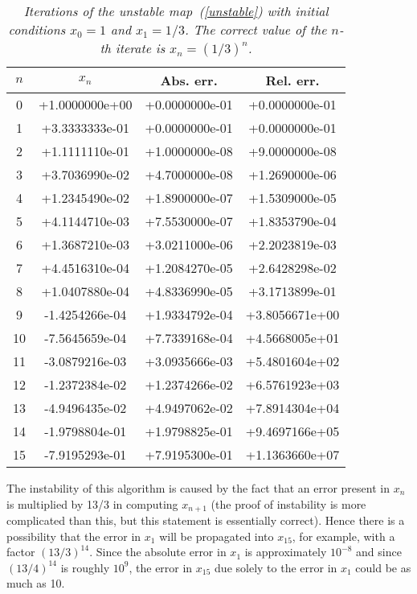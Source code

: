 \begin{table}
 \begin{center}
  \begin{tabular}{|c|c|c|c|} \hline
   $n$ & $x_n$ & Abs. err. & Rel. err. \\ \hline \hline
    0 & +1.0000000e+00 & +0.0000000e-01 & +0.0000000e-01 \\ \hline 
    1 & +3.3333333e-01 & +0.0000000e-01 & +0.0000000e-01 \\ \hline 
    2 & +1.1111110e-01 & +1.0000000e-08 & +9.0000000e-08 \\ \hline 
    3 & +3.7036990e-02 & +4.7000000e-08 & +1.2690000e-06 \\ \hline 
    4 & +1.2345490e-02 & +1.8900000e-07 & +1.5309000e-05 \\ \hline 
    5 & +4.1144710e-03 & +7.5530000e-07 & +1.8353790e-04 \\ \hline 
    6 & +1.3687210e-03 & +3.0211000e-06 & +2.2023819e-03 \\ \hline 
    7 & +4.4516310e-04 & +1.2084270e-05 & +2.6428298e-02 \\ \hline 
    8 & +1.0407880e-04 & +4.8336990e-05 & +3.1713899e-01 \\ \hline 
    9 & -1.4254266e-04 & +1.9334792e-04 & +3.8056671e+00 \\ \hline 
   10 & -7.5645659e-04 & +7.7339168e-04 & +4.5668005e+01 \\ \hline 
   11 & -3.0879216e-03 & +3.0935666e-03 & +5.4801604e+02 \\ \hline 
   12 & -1.2372384e-02 & +1.2374266e-02 & +6.5761923e+03 \\ \hline 
   13 & -4.9496435e-02 & +4.9497062e-02 & +7.8914304e+04 \\ \hline 
   14 & -1.9798804e-01 & +1.9798825e-01 & +9.4697166e+05 \\ \hline 
   15 & -7.9195293e-01 & +7.9195300e-01 & +1.1363660e+07 \\ \hline 
  \end{tabular}
 \end{center}
 \caption{\label{unst1} \it Iterations of the unstable
   map~(\ref{unstable}) with initial conditions $x_0=1$ and
   $x_1=1/3$.   The correct value of the $n$-th iterate is $x_n=(1/3)^n$.}
\end{table}

The instability of this algorithm is caused by the fact that an error
present in $x_n$ is multiplied by 13/3 in computing $x_{n+1}$ (the
proof of instability is more complicated than this, but this statement
is essentially correct).  Hence there is a possibility that the error
in $x_1$ will be propagated into $x_{15}$, for example, with a factor
$(13/3)^{14}$.    Since the absolute error in $x_1$ is approximately
$10^{-8}$ and since $(13/4)^{14}$ is roughly $10^9$, the error in
$x_{15}$ due solely to the error in $x_1$ could be as much as 10.   

